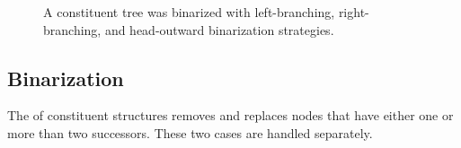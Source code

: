 \documentclass[../../document.tex]{subfiles}
\begin{document}
    \begin{figure}
        \null\hfill
        
        \hspace{.5cm}
        \begin{minipage}{.4\linewidth}
        \end{minipage}

        \vspace{.5cm}

        \begin{minipage}{.4\linewidth}
        \end{minipage}
        \hspace{.5cm}
        
        \hfill\null

        \vspace{.5cm}

        \null\hfill
        
        \hspace{.5cm}
        \begin{minipage}{.4\linewidth}
        \end{minipage}

        \vspace{.5cm}

        \begin{minipage}{.4\linewidth}
        \end{minipage}
        \hspace{.5cm}
        
        \hfill\null

        \vspace{.5cm}

        \caption{\label{fig:ex:pilot}
            A constituent tree was binarized with left-branching, right-branching, and head-outward binarization strategies.
        }
    \end{figure}

    \subsection{Binarization}\label{sec:binarization}
    The  of constituent structures removes and replaces nodes that have either one or more than two successors.
    These two cases are handled separately.
\end{document}
